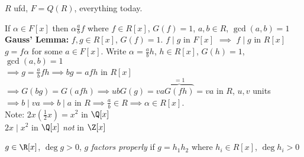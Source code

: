 $R$ ufd, $F=Q(R)$, everything today.

\lem If $\alpha\in F[x]$ then $\alpha\frac{a}{b}f$ where $f\in R[x]$, $G(f)=1$, $a,b\in R$, $\gcd(a,b)=1$ \\
\textbf{Gauss' Lemma: }$f,g\in R[x]$, $G(f)=1$.  $f\mid g$ in $F[x]$ $\implies$ $f\mid g$ in $R[x]$ \\
\pf $g=f\alpha$ for some $a\in F[x]$.  Write $\alpha=\frac{a}{b}h$, $h\in R[x]$, $G(h)=1$, $\gcd(a,b)=1$ \\
$\implies g=\frac{a}{b}fh \implies bg=afh$ in $R[x]$ \\
$\implies G(bg) = G(afh) \implies ubG(g) = va\overbrace{G(fh)}^{=1}=va$ in $R$, $u,v$ units \\
$\implies b\mid va\implies b\mid a\text{ in }R\implies\frac{a}{b}\in R\implies\alpha\in R[x]$. \\
Note: $2x(\frac12x)=x^2$ in $\Q[x]$ \\
$2x\mid x^2$ in $\Q[x]$ \emph{not} in $\Z[x]$

 $g\in\R[x]$, $\deg g>0$, $g$ \emph{factors properly} if $g=h_1h_2$ where $h_i\in R[x]$, $\deg h_i>0$

